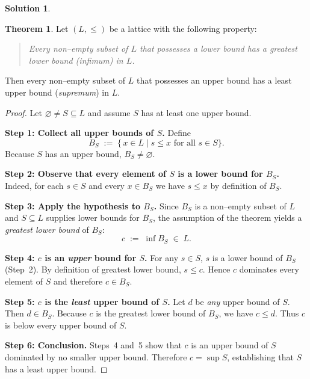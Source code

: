 \documentclass[12pt]{article}
\theoremstyle{definition} %
\newtheorem{solution}{Solution}
\newtheorem{theorem}{Theorem}
\theoremstyle{plain} %
\begin{document}
  \begin{solution}
    \begin{theorem}
      \label{thm:sup-from-inf}
      Let $(L,\le)$ be a lattice with the following property:
      
      \begin{quote}
      \emph{Every non–empty subset of $L$ that possesses a lower bound
      has a greatest lower bound (\emph{infimum}) in $L$.}
      \end{quote}
      
      Then every non–empty subset of $L$ that possesses an upper bound
      has a least upper bound (\emph{supremum}) in $L$.
      \end{theorem}
      
      \begin{proof}
      Let $\varnothing\neq S\subseteq L$ and assume $S$ has at least
      one upper bound.
      
      \medskip
      \noindent\textbf{Step 1:  Collect all upper bounds of $S$.}
      Define
      \[
        B_S\;:=\;\bigl\{\,x\in L \mid s\le x \text{ for all } s\in S \bigr\}.
      \]
      Because $S$ has an upper bound, $B_S\neq\varnothing$.
      
      \medskip
      \noindent\textbf{Step 2:  Observe that every element of $S$ is a lower
      bound for $B_S$.}
      Indeed, for each $s\in S$ and every $x\in B_S$ we have $s\le x$ by
      definition of $B_S$.
      
      \medskip
      \noindent\textbf{Step 3:  Apply the hypothesis to $B_S$.}
      Since $B_S$ is a non–empty subset of $L$ and
      $S\subseteq L$ supplies lower bounds for $B_S$,
      the assumption of the theorem yields a \emph{greatest lower bound}
      of $B_S$:
      \[
        c \;:=\; \inf B_S \;\in\; L.
      \]
      
      \medskip
      \noindent\textbf{Step 4:  $c$ is an \emph{upper} bound for $S$.}
      For any $s\in S$, $s$ is a lower bound of $B_S$ (Step 2).
      By definition of greatest lower bound, $s\le c$.
      Hence $c$ dominates every element of $S$ and therefore
      $c\in B_S$.
      
      \medskip
      \noindent\textbf{Step 5:  $c$ is the \emph{least} upper bound of $S$.}
      Let $d$ be \emph{any} upper bound of $S$.
      Then $d\in B_S$.
      Because $c$ is the greatest lower bound of $B_S$, we have $c\le d$.
      Thus $c$ is below every upper bound of $S$.
      
      \medskip
      \noindent\textbf{Step 6:  Conclusion.}
      Steps 4 and 5 show that $c$ is an upper bound of $S$
      dominated by no smaller upper bound.
      Therefore $c=\sup S$, establishing that $S$ has a least upper bound.
      \end{proof}    
  \end{solution}
\end{document}
